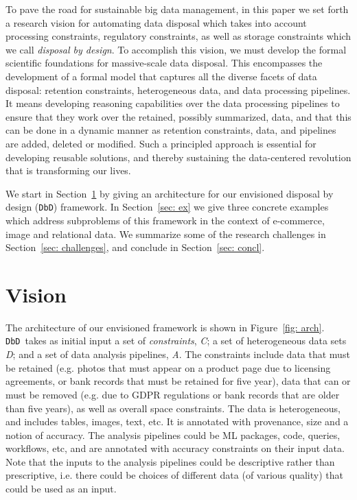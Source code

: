 \documentclass[11pt,dvipdfm]{article}
\newcommand{\grid}{{\tt DbD}}
\begin{document}
To pave the road for sustainable big data management, in this paper we set forth a research vision for automating data disposal which takes into account processing constraints, regulatory constraints, as well as storage constraints which we call {\em disposal by design}.  
To accomplish this vision, 
we must develop the formal scientific foundations for massive-scale data disposal. This encompasses the development of a formal model that captures all the diverse facets of data disposal: retention constraints, heterogeneous data, and data processing pipelines.  It means developing reasoning capabilities over the data processing pipelines to ensure that they work over the retained, possibly summarized, data, and that this can be done in a dynamic manner as retention constraints, data, and pipelines are added, deleted or modified. Such a principled approach is essential for developing reusable solutions, and thereby sustaining the data-centered revolution that is transforming our lives.

We start in Section~\ref{sec: vision} by giving an  architecture for our envisioned disposal by design (\grid) framework.  In Section~\ref{sec: ex} we give three concrete examples which address subproblems of this framework in the context of e-commerce, image and relational data.  We summarize some of the research challenges in Section~\ref{sec: challenges}, and conclude in Section~\ref{sec: concl}.





\section{Vision}
\label{sec: vision}


The architecture of our envisioned framework is shown in Figure~\ref{fig: arch}.
\grid\ takes as initial input a set of {\em constraints}, \textit{C};
a set of heterogeneous data sets \textit{D};
and a set of data analysis pipelines, \textit{A}. 
The constraints include data that must be retained (e.g. photos that must appear on a product page due to licensing agreements, or bank records that must be retained for five year), data that can or must be removed (e.g. due to GDPR regulations or bank records that are older than five years), as well as overall space constraints.  The data is heterogeneous, and includes tables, images, text, etc.  It is annotated with provenance, size and a notion of accuracy.  The analysis pipelines could be ML packages, code, queries, workflows, etc, and are annotated with accuracy constraints on their input data. 
Note that the inputs to the analysis pipelines could be descriptive rather than prescriptive, i.e. there could be choices of different data (of various quality) that could be used as an input.
\end{document}
